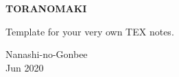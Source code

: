 \begin{titlepage}
    \begin{center}
        \vspace*{1cm}
        \Huge
        \textbf{TORANOMAKI}
 
        \vspace{0.5cm}
        \Large
        Template for your very own TEX notes.

        \vspace{2.5cm}
        Nanashi-no-Gonbee\\
        Jun 2020\\
             
    \end{center}
\end{titlepage}